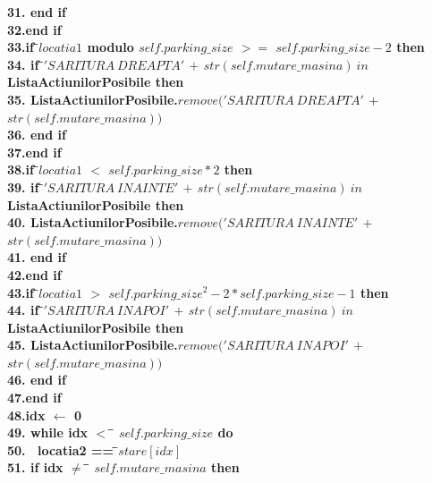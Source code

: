 \documentclass{article}
\begin{document}
\begin{center}
\begin{tabbing}
\bfseries{31.}\indent\>        \>\textbf{end if}\\
\bfseries{32.}\indent\>\textbf{end if}\\
\bfseries{33.}\indent\>\textbf{if } \=$locatia1$ \textbf{ modulo } $self.parking\_size$ $>=$ $self.parking\_size-2$ \textbf{ then}\\
\bfseries{34.}\indent\>       \>\textbf{if } \=$'SARITURA\ DREAPTA'$ $+$ $str(self.mutare\_masina) \ in \ $ \textbf{ListaActiunilorPosibile} \textbf{ then} \\
\bfseries{35.}\indent          \> \> \>\textbf{ListaActiunilorPosibile}.$remove('SARITURA\ DREAPTA'$ $+$ $str(self.mutare\_masina))$\\
\bfseries{36.}\indent\>        \>\textbf{end if}\\
\bfseries{37.}\indent\>\textbf{end if}\\
\bfseries{38.}\indent\>\textbf{if } \=$locatia1$ $<$ $self.parking\_size*2$ \textbf{ then}\\
\bfseries{39.}\indent\>       \>\textbf{if } \=$'SARITURA\ INAINTE'$ $+$ $str(self.mutare\_masina) \ in \ $ \textbf{ListaActiunilorPosibile} \textbf{ then} \\
\bfseries{40.}\indent          \> \> \>\textbf{ListaActiunilorPosibile}.$remove('SARITURA\ INAINTE'$ $+$ $str(self.mutare\_masina))$\\
\bfseries{41.}\indent\>        \>\textbf{end if}\\
\bfseries{42.}\indent\>\textbf{end if}\\
\bfseries{43.}\indent\>\textbf{if } \=$locatia1$ $>$ $self.parking\_size^2-2*self.parking\_size-1$  \textbf{ then}\\
\bfseries{44.}\indent\>       \>\textbf{if } \=$'SARITURA\ INAPOI'$ $+$ $str(self.mutare\_masina) \ in \ $ \textbf{ListaActiunilorPosibile} \textbf{ then} \\
\bfseries{45.}\indent          \> \> \>\textbf{ListaActiunilorPosibile}.$remove('SARITURA\ INAPOI'$ $+$ $str(self.mutare\_masina))$\\
\bfseries{46.}\indent\>        \>\textbf{end if}\\
\bfseries{47.}\indent\>\textbf{end if}\\
\bfseries{48.}\indent\>idx $\leftarrow$ 0\\ 
\bfseries{49.}\indent\> \textbf{while} idx  $<$ \= $self.parking\_size$ \textbf{ do}\\
\bfseries{50.}\indent\> \ {locatia2 } == \=$stare[idx]$  \\
\bfseries{51.}\indent\> \textbf{if } idx  $\neq$ \= $self.mutare\_masina$ \textbf{ then}\\

\end{tabbing}
\end{center}
\end{document}
